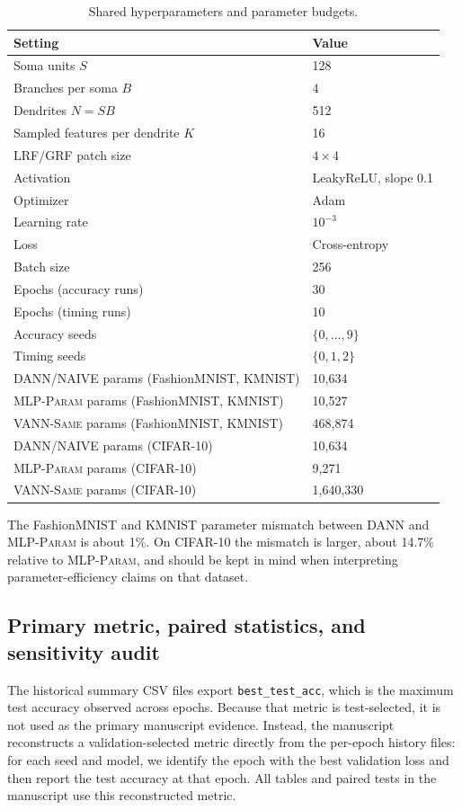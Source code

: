 \documentclass[preprint,12pt]{elsarticle}
\newcommand{\MLPPARAM}{\textsc{MLP-Param}}
\newcommand{\VANNSAME}{\textsc{VANN-Same}}
\begin{document}
\begin{table}[ht]
\centering
\caption{Shared hyperparameters and parameter budgets.}
\label{tab:hyper}
\small
\begin{tabular}{ll}
\toprule
\textbf{Setting} & \textbf{Value} \\
\midrule
Soma units $S$ & 128 \\
Branches per soma $B$ & 4 \\
Dendrites $N=SB$ & 512 \\
Sampled features per dendrite $K$ & 16 \\
LRF/GRF patch size & $4 \times 4$ \\
Activation & LeakyReLU, slope 0.1 \\
Optimizer & Adam \\
Learning rate & $10^{-3}$ \\
Loss & Cross-entropy \\
Batch size & 256 \\
Epochs (accuracy runs) & 30 \\
Epochs (timing runs) & 10 \\
Accuracy seeds & $\{0,\dots,9\}$ \\
Timing seeds & $\{0,1,2\}$ \\
\midrule
DANN/NAIVE params (FashionMNIST, KMNIST) & 10,634 \\
\MLPPARAM{} params (FashionMNIST, KMNIST) & 10,527 \\
\VANNSAME{} params (FashionMNIST, KMNIST) & 468,874 \\
DANN/NAIVE params (CIFAR-10) & 10,634 \\
\MLPPARAM{} params (CIFAR-10) & 9,271 \\
\VANNSAME{} params (CIFAR-10) & 1,640,330 \\
\bottomrule
\end{tabular}
\end{table}

The FashionMNIST and KMNIST parameter mismatch between DANN and \MLPPARAM{} is about 1\%. On CIFAR-10 the mismatch is larger, about 14.7\% relative to \MLPPARAM{}, and should be kept in mind when interpreting parameter-efficiency claims on that dataset.

\subsection{Primary metric, paired statistics, and sensitivity audit}
\label{sec:metrics}

The historical summary CSV files export \texttt{best\_test\_acc}, which is the maximum test accuracy observed across epochs. Because that metric is test-selected, it is not used as the primary manuscript evidence. Instead, the manuscript reconstructs a validation-selected metric directly from the per-epoch history files: for each seed and model, we identify the epoch with the best validation loss and then report the test accuracy at that epoch. All tables and paired tests in the manuscript use this reconstructed metric.
\end{document}
